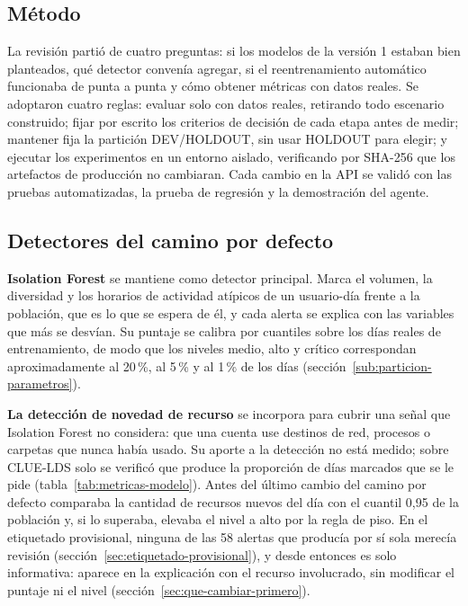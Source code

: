 \subsection{Método}
\label{sec:revision-metodo}
La revisión partió de cuatro preguntas: si los modelos de la versión 1 estaban bien planteados, qué detector convenía agregar, si el reentrenamiento automático funcionaba de punta a punta y cómo obtener métricas con datos reales. Se adoptaron cuatro reglas: evaluar solo con datos reales, retirando todo escenario construido; fijar por escrito los criterios de decisión de cada etapa antes de medir; mantener fija la partición DEV/HOLDOUT, sin usar HOLDOUT para elegir; y ejecutar los experimentos en un entorno aislado, verificando por SHA-256 que los artefactos de producción no cambiaran. Cada cambio en la API se validó con las pruebas automatizadas, la prueba de regresión y la demostración del agente.

\subsection{Detectores del camino por defecto}
\label{sec:revision-diagnostico}
\textbf{Isolation Forest} se mantiene como detector principal. Marca el volumen, la diversidad y los horarios de actividad atípicos de un usuario-día frente a la población, que es lo que se espera de él, y cada alerta se explica con las variables que más se desvían. Su puntaje se calibra por cuantiles sobre los días reales de entrenamiento, de modo que los niveles medio, alto y crítico correspondan aproximadamente al 20\,\%, al 5\,\% y al 1\,\% de los días (sección~\ref{sub:particion-parametros}).

\textbf{La detección de novedad de recurso} se incorpora para cubrir una señal que Isolation Forest no considera: que una cuenta use destinos de red, procesos o carpetas que nunca había usado. Su aporte a la detección no está medido; sobre CLUE-LDS solo se verificó que produce la proporción de días marcados que se le pide (tabla~\ref{tab:metricas-modelo}). Antes del último cambio del camino por defecto comparaba la cantidad de recursos nuevos del día con el cuantil 0,95 de la población y, si lo superaba, elevaba el nivel a alto por la regla de piso. En el etiquetado provisional, ninguna de las 58 alertas que producía por sí sola merecía revisión (sección~\ref{sec:etiquetado-provisional}), y desde entonces es solo informativa: aparece en la explicación con el recurso involucrado, sin modificar el puntaje ni el nivel (sección~\ref{sec:que-cambiar-primero}).

